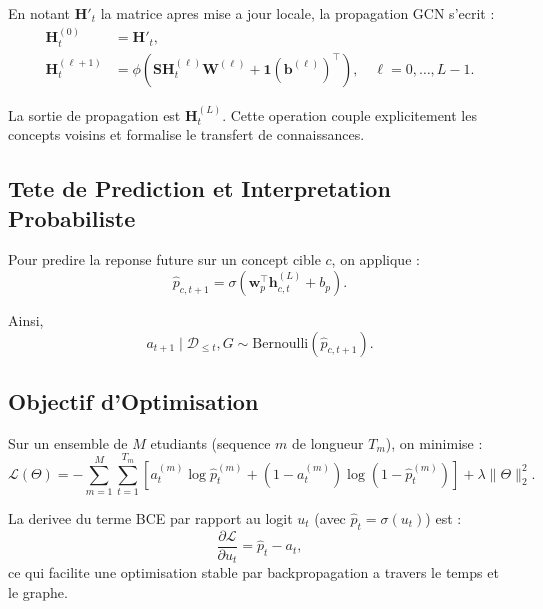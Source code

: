 \documentclass[11pt, a4paper]{article}
\begin{document}
En notant $\mathbf{H}'_t$ la matrice apres mise a jour locale, la propagation GCN s'ecrit :
\begin{align}
    \mathbf{H}_t^{(0)}      & = \mathbf{H}'_t,                                                                                                                      \\
    \mathbf{H}_t^{(\ell+1)} & = \phi\left(\mathbf{S}\mathbf{H}_t^{(\ell)}\mathbf{W}^{(\ell)} + \mathbf{1}(\mathbf{b}^{(\ell)})^\top\right), \quad \ell=0,\dots,L-1.
\end{align}

La sortie de propagation est $\mathbf{H}_t^{(L)}$. Cette operation couple explicitement les concepts voisins et formalise le transfert de connaissances.

\subsection{Tete de Prediction et Interpretation Probabiliste}

Pour predire la reponse future sur un concept cible $c$, on applique :
\begin{equation}
    \hat{p}_{c,t+1} = \sigma\left(\mathbf{w}_p^\top \mathbf{h}_{c,t}^{(L)} + b_p\right).
\end{equation}

Ainsi,
\begin{equation}
    a_{t+1} \mid \mathcal{D}_{\le t}, G \sim \mathrm{Bernoulli}(\hat{p}_{c,t+1}).
\end{equation}

\subsection{Objectif d'Optimisation}

Sur un ensemble de $M$ etudiants (sequence $m$ de longueur $T_m$), on minimise :
\begin{equation}
    \mathcal{L}(\Theta)
    = -\sum_{m=1}^{M}\sum_{t=1}^{T_m} \left[a_t^{(m)}\log \hat{p}_t^{(m)} + (1-a_t^{(m)})\log(1-\hat{p}_t^{(m)})\right]
    + \lambda \|\Theta\|_2^2.
\end{equation}

La derivee du terme BCE par rapport au logit $u_t$ (avec $\hat{p}_t=\sigma(u_t)$) est :
\begin{equation}
    \frac{\partial \mathcal{L}}{\partial u_t} = \hat{p}_t - a_t,
\end{equation}
ce qui facilite une optimisation stable par backpropagation a travers le temps et le graphe.
\end{document}
